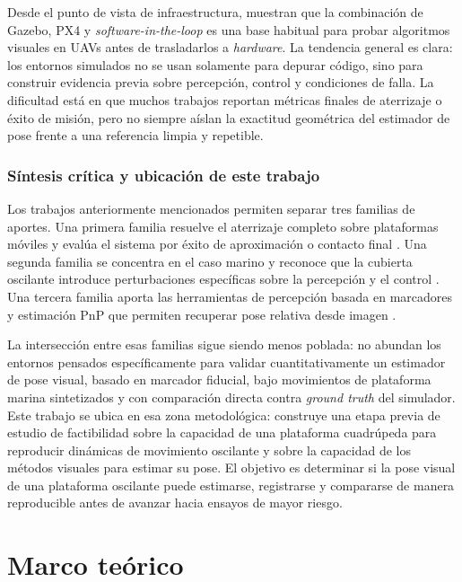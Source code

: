 \documentclass[12pt,a4paper]{report}
\begin{document}
Desde el punto de vista de infraestructura, \citet{Nguyen2019} muestran que la
combinación de Gazebo, PX4 y \textit{software-in-the-loop} es una base habitual
para probar algoritmos visuales en UAVs antes de trasladarlos a \textit{hardware}.
La tendencia general es clara: los entornos simulados no se
usan solamente para depurar código, sino para construir evidencia previa sobre
percepción, control y condiciones de falla. La dificultad está en que muchos
trabajos reportan métricas finales de aterrizaje o éxito de misión, pero no
siempre aíslan la exactitud geométrica del estimador de pose frente a una
referencia limpia y repetible.

\subsection{Síntesis crítica y ubicación de este trabajo}

Los trabajos anteriormente mencionados permiten separar tres familias de aportes. Una primera
familia resuelve el aterrizaje completo sobre plataformas móviles y evalúa el
sistema por éxito de aproximación o contacto final
\citep{Lee2012,Araar2017,Falanga2017,Keipour2022}. Una segunda familia se
concentra en el caso marino y reconoce que la cubierta oscilante introduce
perturbaciones específicas sobre la percepción y el control
\citep{SanchezLopez2014,Delbene2022,Cho2022}. Una tercera familia aporta las
herramientas de percepción basada en marcadores y estimación PnP que permiten recuperar
pose relativa desde imagen
\citep{GarridoJurado2014,RomeroRamirez2018,Olson2011,WangOlson2016,Lepetit2009}.

La intersección entre esas familias sigue siendo menos poblada: no abundan los
entornos pensados específicamente para validar cuantitativamente un estimador de
pose visual, basado en marcador fiducial, bajo movimientos de plataforma marina
sintetizados y con comparación directa contra \textit{ground truth} del
simulador. Este trabajo se
ubica en esa zona metodológica: construye una etapa previa de estudio de
factibilidad sobre la capacidad de una plataforma cuadrúpeda para reproducir
dinámicas de movimiento oscilante y sobre la capacidad de los métodos visuales
para estimar su pose. El objetivo es determinar si la pose visual de una
plataforma oscilante puede estimarse, registrarse y compararse de manera
reproducible antes de avanzar hacia ensayos de mayor riesgo.

\chapter{Marco teórico} \label{mt}
\end{document}
